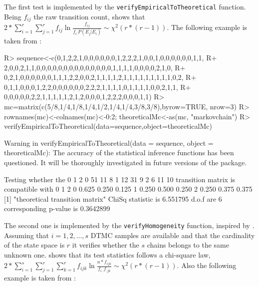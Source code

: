 \documentclass[
  nojss]{jss}
\begin{document}
The first test is implemented by the \texttt{verifyEmpiricalToTheoretical} function. Being \(f_{ij}\) the raw transition count, \cite{kullback1962tests} shows that \(2*\sum_{i=1}^{r}\sum_{j=1}^{r}f_{ij}\ln\frac{f_{ij}}{f_{i.}P\left( E_j | E_i\right)} \sim \chi^2\left ( r*(r-1) \right )\). The following example is taken from \cite{kullback1962tests}:

\begin{CodeChunk}

\begin{CodeInput}
R> sequence<-c(0,1,2,2,1,0,0,0,0,0,0,1,2,2,2,1,0,0,1,0,0,0,0,0,0,1,1,
R+ 2,0,0,2,1,1,0,0,0,0,0,0,0,0,0,0,0,0,0,0,1,1,1,1,0,0,0,0,2,1,0,
R+ 0,2,1,0,0,0,0,0,0,1,1,1,2,2,0,0,2,1,1,1,1,2,1,1,1,1,1,1,1,1,1,0,2,
R+ 0,1,1,0,0,0,1,2,2,0,0,0,0,0,0,2,2,2,1,1,1,1,0,1,1,1,1,0,0,2,1,1,
R+ 0,0,0,0,0,2,2,1,1,1,1,1,2,1,2,0,0,0,1,2,2,2,0,0,0,1,1)
R> mc=matrix(c(5/8,1/4,1/8,1/4,1/2,1/4,1/4,3/8,3/8),byrow=TRUE, nrow=3)
R> rownames(mc)<-colnames(mc)<-0:2; theoreticalMc<-as(mc, "markovchain")
R> verifyEmpiricalToTheoretical(data=sequence,object=theoreticalMc)
\end{CodeInput}

\begin{CodeOutput}
Warning in verifyEmpiricalToTheoretical(data = sequence, object =
theoreticalMc): The accuracy of the statistical inference functions has been
questioned. It will be thoroughly investigated in future versions of the
package.
\end{CodeOutput}

\begin{CodeOutput}
Testing whether the
   0  1  2
0 51 11  8
1 12 31  9
2  6 11 10
transition matrix is compatible with
      0     1     2
0 0.625 0.250 0.125
1 0.250 0.500 0.250
2 0.250 0.375 0.375
[1] "theoretical transition matrix"
ChiSq statistic is 6.551795 d.o.f are 6 corresponding p-value is 0.3642899 
\end{CodeOutput}

\end{CodeChunk}

The second one is implemented by the \texttt{verifyHomogeneity} function, inspired by \cite[section~9]{kullback1962tests}. Assuming that \(i=1,2, \ldots, s\) DTMC samples are available and that the cardinality of the state space is \(r\) it verifies whether the \(s\) chains belongs to the same unknown one. \cite{kullback1962tests} shows that its test statistics follows a chi-square law, \(2*\sum_{i=1}^{s}\sum_{j=1}^{r}\sum_{k=1}^{r}f_{ijk}\ln\frac{n*f_{ijk}}{f_{i..}f_{.jk}} \sim \chi^2\left ( r*(r-1) \right )\). Also the following example is taken from \cite{kullback1962tests}:
\end{document}
